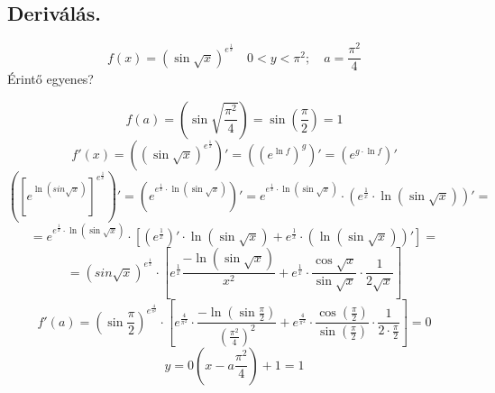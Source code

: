 \documentclass[a4paper,11.5pt]{article}
\begin{document}
	\subsection{Deriválás.}
	\begin{task}
		\[ f(x)=(\sin\sqrt{x})^{e^{\frac{1}{x}}}\quad 0<y<\pi^2;\quad a=\frac{\pi^2}{4} \]
		Érintő egyenes?
		\begin{center}
		\end{center}
		\[ f(a)=\left(\sin\sqrt{\frac{\pi^2}{4}}\right)=\sin\left(\frac{\pi}{2}\right)=1 \]
		\[ f'(x)=\left((\sin\sqrt{x})^{e^{\frac{1}{x}}}\right)'=\left((e^{\ln f})^g\right)'=\left(e^{g\cdot\ln f}\right)' \]
		\[ \left(\left[e^{\ln(sin\sqrt{x})}\right]^{e^{\frac{1}{x}}}\right)'=\left(e^{e^{\frac{1}{x}}\cdot\ln(\sin\sqrt{x})}\right)'=e^{e^{\frac{1}{x}}\cdot\ln(\sin\sqrt{x})}\cdot\left(e^{\frac{1}{x}}\cdot\ln(\sin\sqrt{x})\right)'= \]
		\[= e^{e^{\frac{1}{x}}\cdot\ln(\sin\sqrt{x})}\cdot\left[\left(e^{\frac{1}{x}}\right)'\cdot\ln(\sin\sqrt{x})+e^{\frac{1}{x}}\cdot\left(\ln(\sin\sqrt{x})\right)'\right]=\]
		\[=(sin\sqrt{x})^{e^{\frac{1}{x}}}\cdot\left[e^{\frac{1}{x}}\frac{-\ln(\sin\sqrt{x})}{x^2}+e^{\frac{1}{x}}\cdot\frac{\cos\sqrt{x}}{\sin\sqrt{x}}\cdot\frac{1}{2\sqrt{x}}\right] \]
		\[ f'(a)=\left(\sin\frac{\pi}{2}\right)^{e^{\frac{4}{\pi^2}}}\cdot\left[e^{\frac{4}{\pi^2}}\cdot\frac{-\ln\left(\sin\frac{\pi}{2}\right)}{\left(\frac{\pi^2}{4}\right)^2}+e^{\frac{4}{\pi^2}}\cdot\frac{\cos\left(\frac{\pi}{2}\right)}{\sin\left(\frac{\pi}{2}\right)}\cdot\frac{1}{2\cdot\frac{\pi}{2}}\right]=0 \]
		\[ y=0\left(x-a\frac{\pi^2}{4}\right)+1=1 \]
	\end{task}
\end{document}

